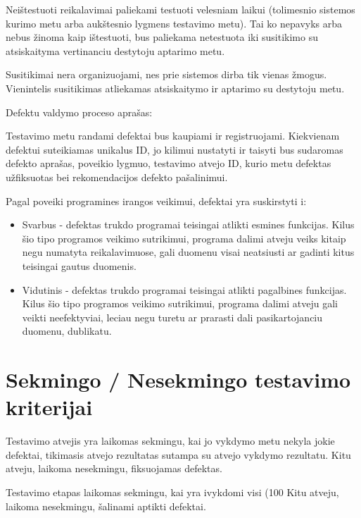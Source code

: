 \documentclass{VUMIFPSkursinis}
\begin{document}
Neištestuoti reikalavimai paliekami testuoti velesniam laikui (tolimesnio sistemos kurimo metu arba aukštesnio lygmens testavimo metu). 
Tai ko nepavyks arba nebus žinoma kaip ištestuoti, bus paliekama netestuota iki susitikimo su atsiskaityma vertinanciu destytoju aptarimo metu. 

Susitikimai nera organizuojami, nes prie sistemos dirba tik vienas žmogus. 
Vienintelis susitikimas atliekamas atsiskaitymo ir aptarimo su destytoju metu.

Defektu valdymo proceso aprašas:

Testavimo metu randami defektai bus kaupiami ir registruojami. 
Kiekvienam defektui suteikiamas unikalus ID, jo kilimui nustatyti ir taisyti bus sudaromas defekto aprašas, poveikio lygmuo, testavimo atvejo ID, kurio metu defektas užfiksuotas bei rekomendacijos defekto pašalinimui.

Pagal poveiki programines irangos veikimui, defektai yra suskirstyti i:

\begin{itemize}
	\item Svarbus - defektas trukdo programai teisingai atlikti esmines funkcijas. Kilus šio tipo programos
	veikimo sutrikimui, programa dalimi atveju veiks kitaip negu numatyta reikalavimuose,
	gali duomenu visai neatsiusti ar gadinti kitus teisingai gautus duomenis.
	\item Vidutinis - defektas trukdo programai teisingai atlikti pagalbines funkcijas. Kilus šio tipo
	programos veikimo sutrikimui, programa dalimi atveju gali veikti neefektyviai, leciau negu
	turetu ar prarasti dali pasikartojanciu duomenu, dublikatu.
\end{itemize}

\section{Sekmingo / Nesekmingo testavimo kriterijai}

Testavimo atvejis yra laikomas sekmingu, kai jo vykdymo metu nekyla jokie defektai, tikimasis atvejo rezultatas sutampa su atvejo vykdymo rezultatu. 
Kitu atveju, laikoma nesekmingu, fiksuojamas defektas.

Testavimo etapas laikomas sekmingu, kai yra ivykdomi visi (100%
Kitu atveju, laikoma nesekmingu, šalinami aptikti defektai.
\end{document}
